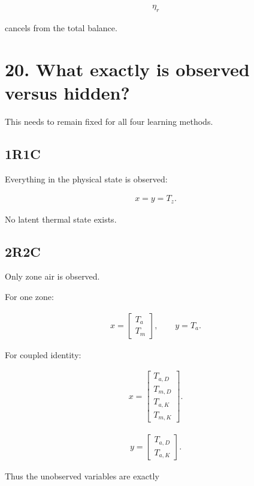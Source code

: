 \documentclass[11pt]{article}
\begin{document}
\begin{align}
\eta_r
\end{align}

cancels from the total balance.

\section*{20. What exactly is observed versus hidden?}

This needs to remain fixed for all four learning methods.

\subsection*{1R1C}

Everything in the physical state is observed:

\begin{align}
x=y=T_z.
\end{align}

No latent thermal state exists.

\subsection*{2R2C}

Only zone air is observed.

For one zone:

\begin{align}
x=
\begin{bmatrix}
T_a\\T_m
\end{bmatrix},
\qquad
y=T_a.
\end{align}

For coupled identity:

\begin{align}
x=
\begin{bmatrix}
T_{a,D}\\
T_{m,D}\\
T_{a,K}\\
T_{m,K}
\end{bmatrix}.
\end{align}

\begin{align}
y=
\begin{bmatrix}
T_{a,D}\\
T_{a,K}
\end{bmatrix}.
\end{align}

Thus the unobserved variables are exactly
\end{document}
